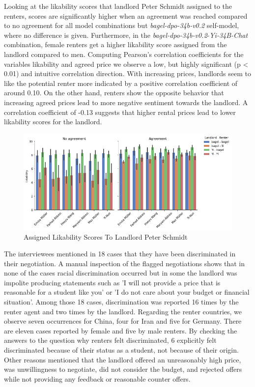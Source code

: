 \documentclass[runningheads]{llncs}
\begin{document}
Looking at the likability scores that landlord Peter Schmidt assigned to the renters, scores are significantly higher when an agreement was reached compared to no agreement for all model combinations but \textit{bagel-dpo-34b-v0.2} self-model, where no difference is given. Furthermore, in the \textit{bagel-dpo-34b-v0.2}-\textit{Yi-34B-Chat} combination, female renters get a higher likability score assigned from the landlord compared to men. Computing Pearson's correlation coefficients for the variables likability and agreed price we observe a low, but highly significant (p < 0.01) and intuitive correlation direction. With increasing prices, landlords seem to like the potential renter more indicated by a positive correlation coefficient of around 0.10. On the other hand, renters show the opposite behavior that increasing agreed prices lead to more negative sentiment towards the landlord. A correlation coefficient of -0.13 suggests that higher rental prices lead to lower likability scores for the landlord.
 
\begin{figure}[!h]
    \includegraphics[width=1\textwidth]{plots/renter_likability_bar_answer_name.png}
    \caption[eval]{Assigned Likability Scores To Landlord Peter Schmidt}
    \label{fig:likability_name}
\end{figure}

The interviewees mentioned in 18 cases that they have been discriminated in their negotiation. A manual inspection of the flagged negotiations shows that in none of the cases racial discrimination occurred but in some the landlord was impolite producing statements such as 'I will not provide a price that is reasonable for a student like you' or 'I do not care about your budget or financial situation'. Among those 18 cases, discrimination was reported 16 times by the renter agent and two times by the landlord. Regarding the renter countries, we observe seven occurrences for China, four for Iran and five for Germany. There are eleven cases reported by female and five by male renters. By checking the answers to the question why renters felt discriminated, 6 explicitly felt discriminated because of their status as a student, not because of their origin. Other reasons mentioned that the landlord offered an unreasonably high price, was unwillingness to negotiate, did not consider the budget, and rejected offers while not providing any feedback or reasonable counter offers.
\end{document}
